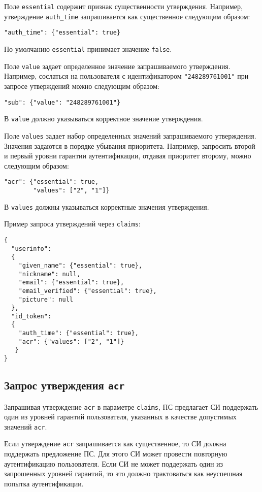 Поле \lstinline{essential} содержит признак существенности утверждения. 
Например, утверждение \lstinline{auth_time} запрашивается как 
существенное следующим образом: 
\begin{lstlisting}
"auth_time": {"essential": true}
\end{lstlisting}

По умолчанию \lstinline{essential} принимает значение \lstinline{false}.

Поле \lstinline{value} задает определенное значение запрашиваемого 
утверждения. Например, сослаться на пользователя с идентификатором 
\lstinline{"248289761001"} при запросе утверждений можно следующим образом:
\begin{lstlisting}
"sub": {"value": "248289761001"}
\end{lstlisting}

В \lstinline{value} должно указываться корректное значение утверждения. 

Поле \lstinline{values} задает набор определенных значений запрашиваемого 
утверждения. Значения задаются в порядке убывания приоритета.
%
Например, запросить второй и первый уровни гарантии аутентификации,
отдавая приоритет второму, можно следующим образом:
\begin{lstlisting}
"acr": {"essential": true,
        "values": ["2", "1"]}
\end{lstlisting}

В \lstinline{values} должны указываться корректные значения утверждения.

Пример запроса утверждений через \lstinline{claims}:
\begin{lstlisting}
{
  "userinfo":
  {
    "given_name": {"essential": true},
    "nickname": null,
    "email": {"essential": true},
    "email_verified": {"essential": true},
    "picture": null
  },
  "id_token":
  {
    "auth_time": {"essential": true},
    "acr": {"values": ["2", "1"]}
   }
}
\end{lstlisting}

\subsection{Запрос утверждения \lstinline{acr}}\label{CLAIMS.ReqAcr}

Запрашивая утверждение \lstinline{acr} в параметре \lstinline{claims}, ПС 
предлагает СИ поддержать один из уровней гарантий пользователя, указанных в 
качестве допустимых значений \lstinline{acr}. 

Если утверждение \lstinline{acr} запрашивается как существенное,
то СИ должна поддержать предложение ПС. 
%
Для этого СИ может провести повторную аутентификацию пользователя. 
%
Если СИ не может поддержать один из запрошенных уровней гарантий, 
то это должно трактоваться как неуспешная попытка аутентификации.

